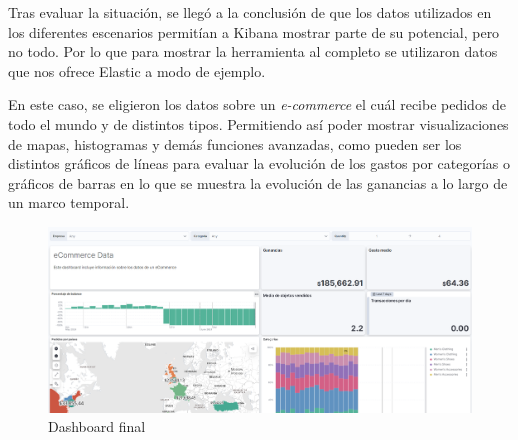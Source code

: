 Tras evaluar la situación, se llegó a la conclusión de que los datos utilizados en los diferentes escenarios permitían a Kibana mostrar parte de su potencial, pero no todo. Por lo que para mostrar la herramienta al completo se utilizaron datos que nos ofrece Elastic a modo de ejemplo.

En este caso, se eligieron los datos sobre un \textit{e-commerce} el cuál recibe pedidos de todo el mundo y de distintos tipos. Permitiendo así poder mostrar visualizaciones de mapas, histogramas y demás funciones avanzadas, como pueden ser los distintos gráficos de líneas para evaluar la evolución de los gastos por categorías o gráficos de barras en lo que se muestra la evolución de las ganancias a lo largo de un marco temporal.

\begin{figure}
    \centering
    \includegraphics[width=1\linewidth]{img/escenario6.png}
    \caption{Dashboard final}
    \label{fig:escenarioNube}
\end{figure}

\paragraph{ }
\paragraph{ }
\paragraph{ }
\paragraph{}
\paragraph{}
\paragraph{}
